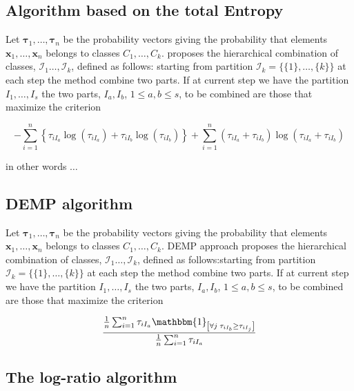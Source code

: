 \documentclass[10pt, a4paper]{article}
\begin{document}
\subsection*{Algorithm based on the total Entropy}

Let ${\boldsymbol\tau}_1, \dots, {\boldsymbol\tau}_n$ be the probability vectors giving the probability that elements $\textbf{x}_1, \dots, \textbf{x}_n$ belongs to classes $C_1, \dots, C_k$.  \cite{baudry2010combining} proposes the  hierarchical combination of classes,  $\mathcal{I}_1 \dots, \mathcal{I}_k$, defined as follows: starting from partition $\mathcal{I}_k = \{\{1\},\dots, \{k\}\}$ at each step the method combine two parts. If at current step we have the partition  $I_1, \dots, I_s$ the two parts, $I_a, I_b$, $1 \leq a,b \leq s$, to be combined are those that maximize the criterion

\[
- \sum_{i=1}^n \left\{ \tau_{iI_a} \log(\tau_{iI_a}) + \tau_{iI_b} \log(\tau_{iI_b})\right\} +  \sum_{i=1}^n  (\tau_{iI_a}+\tau_{iI_b}) \log(\tau_{iI_a} + \tau_{iI_b})
\]

in other words $\dots$

\subsection*{DEMP algorithm}

Let ${\boldsymbol\tau}_1, \dots, {\boldsymbol\tau}_n$ be the probability vectors giving the probability that elements $\textbf{x}_1, \dots, \textbf{x}_n$ belongs to classes $C_1, \dots, C_k$. DEMP approach \citep{hennig2010methods} proposes the hierarchical combination of classes,  $\mathcal{I}_1 \dots, \mathcal{I}_k$, defined as follows:starting from partition $\mathcal{I}_k = \{\{1\},\dots, \{k\}\}$ at each step the method combine two parts. If at current step we have the partition  $I_1, \dots, I_s$ the two parts, $I_a, I_b$, $1 \leq a,b \leq s$,  to be combined are those that maximize the criterion

\[
\frac{ \frac{1}{n} \sum_{i=1}^n {\tau_{iI_a} \mathbbm{1}_{\left[ \forall j\; \tau_{i I_{b}} \geq \tau_{iI_j} \right]}}}{ \frac{1}{n} \sum_{i=1}^n \tau_{iI_a}}
\]

\subsection*{The log-ratio algorithm}


{}
\end{document}
